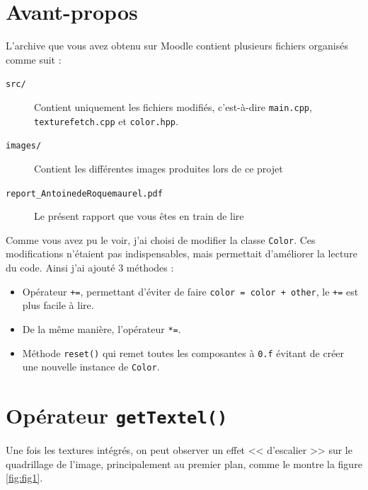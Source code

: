 \documentclass[a4paper, 11pt]{article}
\begin{document}
	\maketitle
	\section{Avant-propos}
	L'archive que vous avez obtenu sur Moodle contient plusieurs fichiers organisés comme suit : 
	\begin{description}
		\item[\texttt{src/}] Contient uniquement les fichiers modifiés, c'est-à-dire \texttt{main.cpp}, \texttt{texturefetch.cpp} et \texttt{color.hpp}.
		\item[\texttt{images/}] Contient les différentes images produites lors de ce projet
		\item[\texttt{report\_AntoinedeRoquemaurel.pdf}] Le présent rapport que vous êtes en train de lire
	\end{description}

	Comme vous avez pu le voir, j'ai choisi de modifier la classe \texttt{Color}. Ces modifications n'étaient pas indispensables, mais permettait d'améliorer la
	lecture du code. Ainsi j'ai ajouté 3 méthodes : 
	\begin{itemize}
		\item Opérateur \texttt{+=}, permettant d'éviter de faire \texttt{color = color + other}, le \texttt{+=} est plus facile à lire.
		\item De la même manière, l'opérateur \texttt{*=}.
		\item Méthode \texttt{reset()} qui remet toutes les composantes à \texttt{0.f} évitant de créer une nouvelle instance de \texttt{Color}.
	\end{itemize}

	\section{Opérateur \texttt{getTextel()}}
	Une fois les textures intégrés, on peut observer un effet << d'escalier >> sur le quadrillage de l'image, principalement au premier plan, comme le montre la
	figure \ref{fig:fig1}. 
\end{document}
